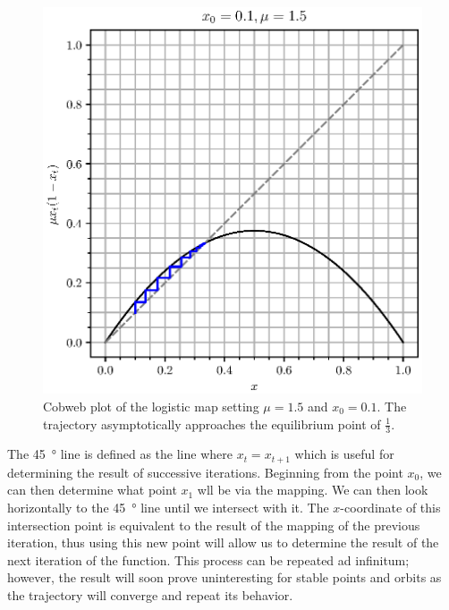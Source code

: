 \begin{figure}
    \centering
    \includegraphics[height=0.4\textheight]{log_fixed_cob.eps}
    \caption{Cobweb plot of the logistic map setting $\mu=1.5$ and $x_0=0.1$. The trajectory asymptotically approaches the equilibrium point of $\frac{1}{3}$.}
    \label{log_fixed_cob}
\end{figure}
The \SI{45}{\degree} line is defined as the line where $x_t=x_{t+1}$ which is useful for determining the result of successive iterations. Beginning from the point $x_0$, we can then determine what point $x_1$ wll be via the mapping. We can then look horizontally to the \SI{45}{\degree} line until we intersect with it. The $x$-coordinate of this intersection point is equivalent to the result of the mapping of the previous iteration, thus using this new point will allow us to determine the result of the next iteration of the function. This process can be repeated ad infinitum; however, the result will soon prove uninteresting for stable points and orbits as the trajectory will converge and repeat its behavior.

